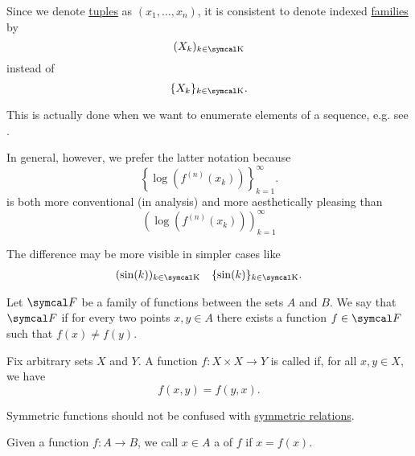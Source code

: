\begin{remark}\label{remark:indexed_family_notation}
  Since we denote \hyperref[def:cartesian_product]{tuples} as \( (x_1, \ldots, x_n) \), it is consistent to denote indexed \hyperref[def:indexed_family]{families} by
  \begin{equation*}
    ( X_k )_{k \in \CK}
  \end{equation*}
  instead of
  \begin{equation*}
    \{ X_k \}_{k \in \CK}.
  \end{equation*}

  This is actually done when we want to enumerate elements of a sequence, e.g. see .

  In general, however, we prefer the latter notation because
  \begin{equation*}
    \left\{ \log \left( f^{(n)}(x_k) \right) \right\}_{k=1}^\infty.
  \end{equation*}
  is both more conventional (in analysis) and more aesthetically pleasing than
  \begin{equation*}
    \left( \log \left( f^{(n)}(x_k) \right) \right)_{k=1}^\infty
  \end{equation*}

  The difference may be more visible in simpler cases like
  \begin{align*}
    (\sin(k))_{k \in \CK}
     &  &
    \{\sin(k)\}_{k \in \CK}.
  \end{align*}
\end{remark}

\begin{definition}\label{def:family_of_functions_separates_points}
  Let \( \Cal{F} \) be a family of functions between the sets \( A \) and \( B \). We say that \( \Cal{F} \)  if for every two points \( x, y \in A \) there exists a function \( f \in \Cal{F} \) such that \( f(x) \neq f(y) \).
\end{definition}

\begin{definition}\label{def:symmetric_function}
  Fix arbitrary sets \( X \) and \( Y \). A function \( f: X \times X \to Y \) is called  if, for all \( x, y \in X \), we have
  \begin{equation*}
    f(x, y) = f(y, x).
  \end{equation*}

  Symmetric functions should not be confused with \hyperref[def:derived_relations/symmetric]{symmetric relations}.
\end{definition}

\begin{definition}\label{def:fixed_point}
  Given a function \( f: A \to B \), we call \( x \in A \) a  of \( f \) if \( x = f(x) \).
\end{definition}
